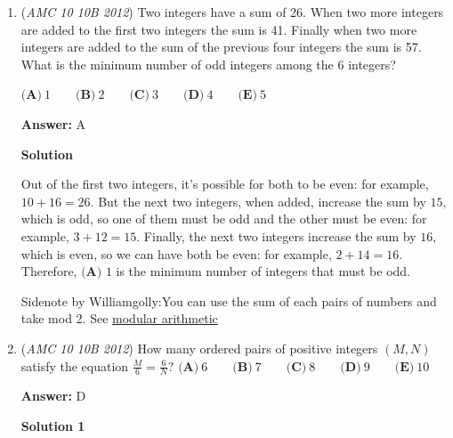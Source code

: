 \begin{enumerate}
 1 < perfect square < 25

 Perfect square can equal: 4, 9, or 16

 Solve for $x$:

 $(x-2)^2=4$
$x=4,0$

 and

 $(x-2)^2=9$
$x=5,-1$

 and

 $(x-2)^2=16$
$x=6,-2$

 The sum of all integer solutions is

 $4+5+6+0+(-1)+(-2)=\boxed{\textbf{(B)} 12}$



	\item (\textit{AMC 10 10B 2012}) Two integers have a sum of 26. When two more integers are added to the first two integers the sum is 41. Finally when two more integers are added to the sum of the previous four integers the sum is 57. What is the minimum number of odd integers among the 6 integers?


 $\textbf{(A)}\ 1\qquad\textbf{(B)}\ 2\qquad\textbf{(C)}\ 3\qquad\textbf{(D)}\ 4\qquad\textbf{(E)}\ 5$

 \textbf{Answer: }A



\textbf{Solution}

Out of the first two integers, it's possible for both to be even: for example, $10 + 16 = 26.$ But the next two integers, when added, increase the sum by $15,$ which is odd, so one of them must be odd and the other must be even: for example, $3 + 12 = 15.$ Finally, the next two integers increase the sum by $16,$ which is even, so we can have both be even: for example, $2 + 14 = 16.$ Therefore, $\boxed{\textbf{(A) } 1}$ is the minimum number of integers that must be odd.

 
Sidenote by Williamgolly:You can use the sum of each pairs of numbers and take mod 2. See \href{https://artofproblemsolving.com/wiki/index.php?title=Modular\_arithmetic}{modular arithmetic}

 


	\item (\textit{AMC 10 10B 2012}) How many ordered pairs of positive integers $(M,N)$ satisfy the equation $\frac{M}{6}=\frac{6}{N}?$
$\textbf{(A)}\ 6\qquad\textbf{(B)}\ 7\qquad\textbf{(C)}\ 8\qquad\textbf{(D)}\ 9\qquad\textbf{(E)}\ 10$

 \textbf{Answer: }D



\textbf{Solution 1}


\end{enumerate}
